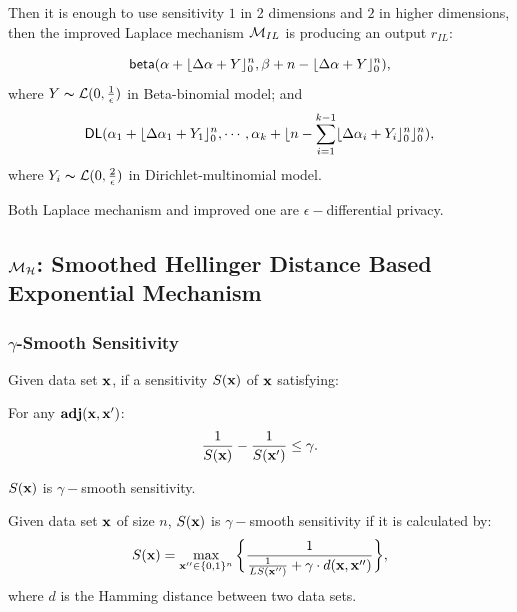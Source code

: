 \documentclass{article}
\begin{document}
 Then it is enough to use sensitivity $1$ in 2 dimensions and $2$ in higher dimensions, then the improved Laplace mechanism $\mathcal{M}_{IL}$ is producing an output $r_{IL}$:

 \[
 \mathsf{beta}(\alpha +  \lfloor{\Delta \alpha + Y}\rfloor^n_0,\beta + n - \lfloor{\Delta \alpha + Y}\rfloor^n_0),
 \]
 where $Y \thicksim \mathcal{L}(0, \frac{1}{\epsilon})$ in Beta-binomial model; and
 \[
 \mathsf{DL}(\alpha_1 +  \lfloor{\Delta \alpha_1 + Y_1}\rfloor^n_0, \cdots, \alpha_k + \lfloor n - \sum_{i = 1}^{k-1}\lfloor{\Delta \alpha_i + Y_i}\rfloor^n_0 \rfloor^n_0),
 \]
where $Y_i \thicksim \mathcal{L}(0, \frac{2}{\epsilon})$ in Dirichlet-multinomial model.

Both Laplace mechanism and improved one are $\epsilon -$differential privacy\cite{dwork2014algorithmic}.


\subsection{$\mathcal{M}_{\mathcal{H}}$: Smoothed Hellinger Distance Based Exponential Mechanism}
\label{subsec_hexpmech}


\subsubsection{$\gamma$-Smooth Sensitivity}
\label{sec_mechs}

\begin{definition}
Given data set $\textbf{x}$, if a sensitivity $S(\textbf{x})$ of $\textbf{x}$ satisfying:

For any $\textbf{adj}(\textbf{x},\textbf{x}')$:
\begin{equation}
\label{eq_gamma_smooth}
\frac{1}{S(\textbf{x})} - \frac{1}{S(\textbf{x}')} \leq \gamma.
\end{equation}

$S(\textbf{x})$ is $\gamma -$smooth sensitivity.

\end{definition}

\begin{thm}
\label{thm_gamma_smooth}
Given data set $\textbf{x}$ of size $n$, $S(\textbf{x})$ is $\gamma -$smooth sensitivity if it is calculated by:
\begin{equation}
  \label{eq_smooth}
   S(\textbf{x})=\max_{\textbf{x}'' \in \{0,1\}^{n}}\bigg \{ \frac{1}{\frac{1}{LS(\textbf{x}'')} +\gamma \cdot d(\textbf{x},\textbf{x}'')} \bigg \},
\end{equation}
where $d$ is the Hamming distance between two data sets.
\end{thm}
\end{document}
